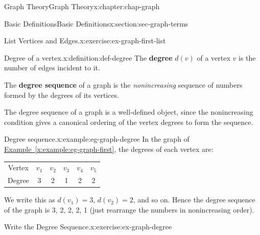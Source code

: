 \documentclass[oneside,10pt,]{book}
\newcommand{\tabularfont}{\relax}
\newcommand{\xreffont}{\relax}
\newcommand{\terminology}[1]{\textbf{#1}}
\numberwithin{equation}{section}
\newcommand{\hrulemedium}{\noalign{\hrule height 0.07em}}
\begin{document}
\begin{chapterptx}{Graph Theory}{}{Graph Theory}{}{}{x:chapter:chap-graph}
\begin{sectionptx}{Basic Definitions}{}{Basic Definitions}{}{}{x:section:sec-graph-terms}
\begin{inlineexercise}{List Vertices and Edges.}{x:exercise:ex-graph-first-list}
\begin{sidebyside}{2}{0.2}{0.2}{0.06}
\begin{sbspanel}{0.32}
{
}%
\end{sbspanel}%
\end{sidebyside}%
\end{inlineexercise}
\begin{definition}{Degree of a vertex.}{x:definition:def-degree}%
The \terminology{degree} \(d(v)\) of a vertex \(v\) is the number of edges incident to it. \label{g:notation:id246044}%
\par
The \terminology{degree sequence} of a graph is the \emph{nonincreasing} sequence of numbers formed by the degrees of its vertices.%
\end{definition}
The degree sequence of a graph is a well-defined object, since the nonincreasing condition gives a canonical ordering of the vertex degrees to form the sequence.%
\begin{example}{Degree sequence.}{x:example:eg-graph-degree}%
In the graph of \hyperref[x:example:eg-graph-first]{Example~{\xreffont\ref{x:example:eg-graph-first}}}, the degrees of each vertex are:%
\begin{sidebyside}{1}{0.3}{0.3}{0}%
\begin{sbspanel}{0.4}%
{\centering%
{\tabularfont%
\begin{tabular}{cccccc}
Vertex&\(v_1\)&\(v_2\)&\(v_3\)&\(v_4\)&\(v_5\)\tabularnewline\hrulemedium
Degree&3&2&1&2&2
\end{tabular}
}%
\par}
\end{sbspanel}%
\end{sidebyside}%
\par
We write this as \(d(v_1) = 3\), \(d(v_2) = 2\), and so on. Hence the degree sequence of the graph is 3, 2, 2, 2, 1 (just rearrange the numbers in nonincreasing order).%
\end{example}
\begin{inlineexercise}{Write the Degree Sequence.}{x:exercise:ex-graph-degree}%

\end{inlineexercise}
\end{sectionptx}
\end{chapterptx}
\end{document}
